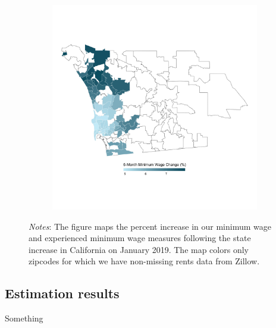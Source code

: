 \begin{figure}
\begin{subfigure}[b]{0.55\textwidth}
		\includegraphics[width = \textwidth]
			{../../analysis/descriptive_maps/output/San_Diego_expmw_msa.png}
	\end{subfigure}
	\begin{minipage}{0.95\textwidth} \footnotesize
		\vspace{2mm} 
		\textit{Notes}: The figure maps the percent increase in our minimum wage and 
		experienced minimum wage measures following the state increase in California
		on January 2019. The map colors only zipcodes for which we have non-missing 
		rents data from Zillow.
	\end{minipage}
\end{figure}



\subsection{Estimation results}

Something

